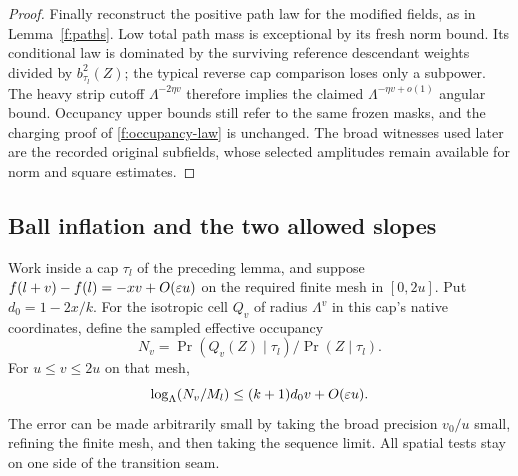 \begin{proof}
Finally reconstruct the positive path law for the modified fields,
as in Lemma~\ref{f:paths}. Low total path mass is exceptional by its
fresh norm bound. Its conditional law is dominated by the surviving
reference descendant weights divided by $b_{\tau_l}^2(Z)$; the
typical reverse cap comparison loses only a subpower. The heavy
strip cutoff $\Lambda^{-2\eta v}$ therefore implies the claimed
$\Lambda^{-\eta v+o(1)}$ angular bound. Occupancy upper bounds still
refer to the same frozen masks, and the charging proof of
\eqref{f:occupancy-law} is unchanged. The broad witnesses used later
are the recorded original subfields, whose selected amplitudes
remain available for norm and square estimates.
\end{proof}

\subsection{Ball inflation and the two allowed slopes}

\begin{lemma}\label{f:inflation}
Work inside a cap $\tau_l$ of the preceding lemma, and suppose
$f(l+v)-f(l)=-xv+O(\varepsilon u)$ on the required finite mesh in $[0,2u]$.
Put $d_0=1-2x/k$. For the isotropic cell $Q_v$ of radius
$\Lambda^v$ in this cap's native coordinates, define the sampled
effective occupancy
\[
 N_v=\Pr(Q_v(Z)\mid\tau_l)/\Pr(Z\mid\tau_l).
\]
For $u\le v\le2u$ on that mesh,
\begin{equation}\label{f:inflation-occupancy}
 \log_\Lambda(N_v/M_l)\le(k+1)d_0v+O(\varepsilon u).
\end{equation}
The error can be made arbitrarily small by taking the broad precision
$v_0/u$ small, refining the finite mesh, and then taking the sequence
limit. All spatial tests stay on one side of the transition seam.
\end{lemma}

